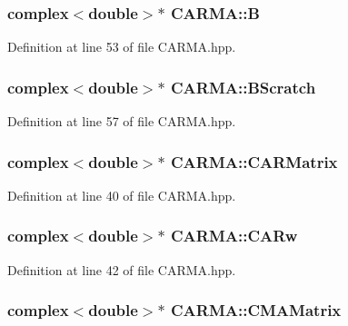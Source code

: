 \hypertarget{class_c_a_r_m_a_ae95636dd50674cb98dc309ce7042f2ed}{
\subsubsection[{B}]{\setlength{\rightskip}{0pt plus 5cm}complex$<$double$>$$\ast$ C\-A\-R\-M\-A\-::\-B}}\label{class_c_a_r_m_a_ae95636dd50674cb98dc309ce7042f2ed}


Definition at line 53 of file C\-A\-R\-M\-A.\-hpp.

\hypertarget{class_c_a_r_m_a_a1086542a2badf2a6d6cab3f4dc3825fd}{
\subsubsection[{B\-Scratch}]{\setlength{\rightskip}{0pt plus 5cm}complex$<$double$>$$\ast$ C\-A\-R\-M\-A\-::\-B\-Scratch}}\label{class_c_a_r_m_a_a1086542a2badf2a6d6cab3f4dc3825fd}


Definition at line 57 of file C\-A\-R\-M\-A.\-hpp.

\hypertarget{class_c_a_r_m_a_a4753a35f5afb7c4f3a51f1fbfd8ddc96}{
\subsubsection[{C\-A\-R\-Matrix}]{\setlength{\rightskip}{0pt plus 5cm}complex$<$double$>$$\ast$ C\-A\-R\-M\-A\-::\-C\-A\-R\-Matrix}}\label{class_c_a_r_m_a_a4753a35f5afb7c4f3a51f1fbfd8ddc96}


Definition at line 40 of file C\-A\-R\-M\-A.\-hpp.

\hypertarget{class_c_a_r_m_a_a999a48a6285c64b5ce971cfbd2a4a549}{
\subsubsection[{C\-A\-Rw}]{\setlength{\rightskip}{0pt plus 5cm}complex$<$double$>$$\ast$ C\-A\-R\-M\-A\-::\-C\-A\-Rw}}\label{class_c_a_r_m_a_a999a48a6285c64b5ce971cfbd2a4a549}


Definition at line 42 of file C\-A\-R\-M\-A.\-hpp.

\hypertarget{class_c_a_r_m_a_ae9fc6695efc343e26009ce33d07fdf27}{
\subsubsection[{C\-M\-A\-Matrix}]{\setlength{\rightskip}{0pt plus 5cm}complex$<$double$>$$\ast$ C\-A\-R\-M\-A\-::\-C\-M\-A\-Matrix}}\label{class_c_a_r_m_a_ae9fc6695efc343e26009ce33d07fdf27}


